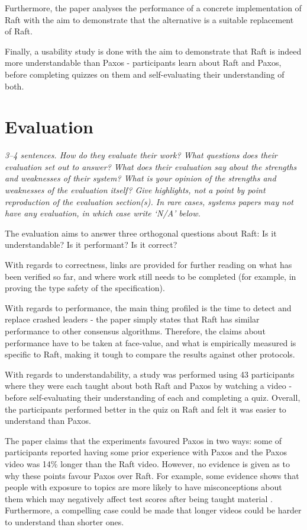 \documentclass[11pt]{article}
\begin{document}
Furthermore, the paper analyses the performance of a concrete implementation of
Raft \cite{LogCabin} with the aim to demonstrate that the alternative is a
suitable replacement of Raft.

Finally, a usability study is done with the aim to demonstrate that Raft is
indeed more understandable than Paxos - participants learn about Raft and
Paxos, before completing quizzes on them and self-evaluating their
understanding of both.

\section*{Evaluation}

\textsl{3--4 sentences. How do they evaluate their work? What questions does
their evaluation set out to answer? What does their evaluation say about the
strengths and weaknesses of their system? What is your opinion of the strengths
and weaknesses of the evaluation itself? Give highlights, not a point by point
reproduction of the evaluation section(s). In rare cases, systems papers may
not have any evaluation, in which case write `N/A' below.}

The evaluation aims to answer three orthogonal questions about Raft: Is it
understandable? Is it performant? Is it correct?

With regards to correctness, links are provided for further reading on what has
been verified so far, and where work still needs to be completed (for example,
in proving the type safety of the specification).

With regards to performance, the main thing profiled is the time to detect and
replace crashed leaders - the paper simply states that Raft has similar
performance to other consensus algorithms. Therefore, the claims about
performance have to be taken at face-value, and what is empirically measured is
specific to Raft, making it tough to compare the results against other
protocols.

With regards to understandability, a study was performed using 43 participants
where they were each taught about both Raft and Paxos by watching a video -
before self-evaluating their understanding of each and completing a quiz.
Overall, the participants performed better in the quiz on Raft and felt it was
easier to understand than Paxos.

The paper claims that the experiments favoured Paxos in two ways: some of
participants reported having some prior experience with Paxos and the Paxos
video was 14\% longer than the Raft video. However, no evidence is given as to
why these points favour Paxos over Raft. For example, some evidence shows that
people with exposure to topics are more likely to have misconceptions about
them which may negatively affect test scores after being taught material
\cite{DerekMuller2008}. Furthermore, a compelling case could be made that
longer videos could be harder to understand than shorter ones.
\end{document}
